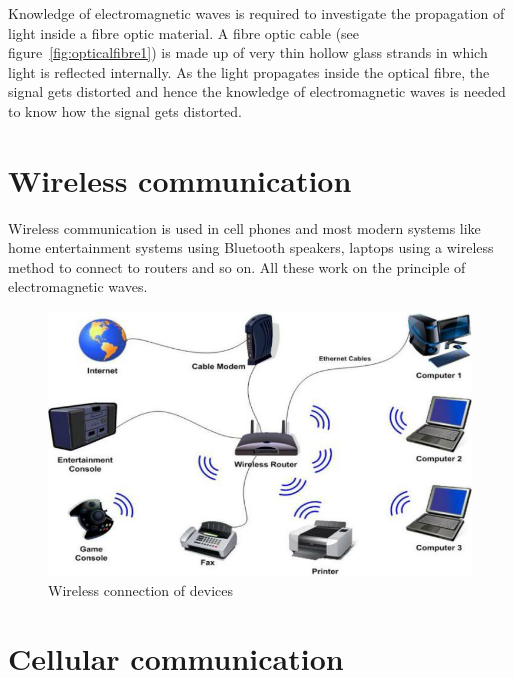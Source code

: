 Knowledge of electromagnetic waves is required to investigate the propagation of light inside a fibre optic material. A fibre optic cable (see figure~\ref{fig:opticalfibre1}) is made up of very thin hollow glass strands in which light is reflected internally. As the light propagates inside the optical fibre, the signal gets distorted and hence the knowledge of electromagnetic waves is needed to know how the signal gets distorted.

\section{Wireless communication}

Wireless communication is used in cell phones and most modern systems like home entertainment systems using Bluetooth speakers, laptops using a wireless method to connect to routers and so on. All these work on the principle of electromagnetic waves.
\begin{figure}[h]
\centering
\includegraphics[scale=0.3]{./graphics/Expert-support-for-wireless-communication-projects}
\caption{Wireless connection of devices}
\end{figure}
\section{Cellular communication} 

